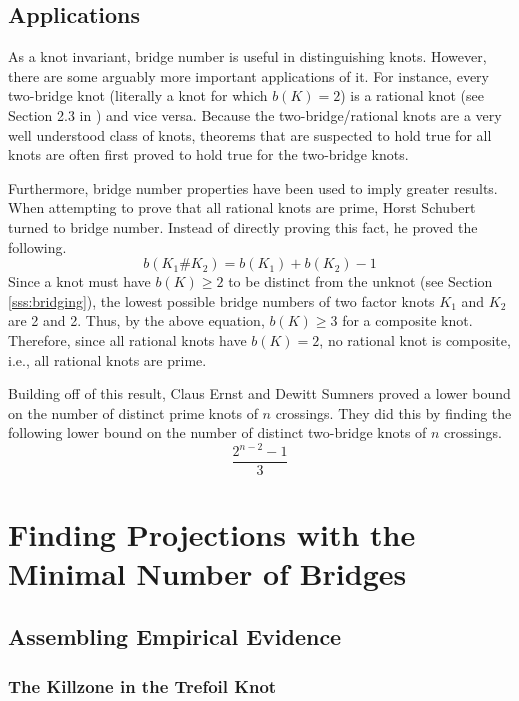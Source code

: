 \documentclass[titlepage]{article}
\begin{document}
\subsection{Applications}\label{sss:applications}
As a knot invariant, bridge number is useful in distinguishing knots. However, there are some arguably more important applications of it. For instance, every two-bridge knot (literally a knot for which $b(K)=2$) is a rational knot (see Section 2.3 in \cite{bib:knotnotes}) and vice versa. Because the two-bridge/rational knots are a very well understood class of knots, theorems that are suspected to hold true for all knots are often first proved to hold true for the two-bridge knots.\par
Furthermore, bridge number properties have been used to imply greater results. When attempting to prove that all rational knots are prime, Horst Schubert turned to bridge number. Instead of directly proving this fact, he proved the following.
\begin{equation*}
    b(K_1\#K_2) = b(K_1)+b(K_2)-1
\end{equation*}
Since a knot must have $b(K)\geq 2$ to be distinct from the unknot (see Section \ref{sss:bridging}), the lowest possible bridge numbers of two factor knots $K_1$ and $K_2$ are 2 and 2. Thus, by the above equation, $b(K)\geq 3$ for a composite knot. Therefore, since all rational knots have $b(K)=2$, no rational knot is composite, i.e., all rational knots are prime.\par
Building off of this result, Claus Ernst and Dewitt Sumners proved a lower bound on the number of distinct prime knots of $n$ crossings. They did this by finding the following lower bound on the number of distinct two-bridge knots of $n$ crossings.
\begin{equation*}
    \frac{2^{n-2}-1}{3}
\end{equation*}
\newpage



\section{Finding Projections with the Minimal Number of Bridges}
\subsection{Assembling Empirical Evidence}\label{sss:evidence}
\subsubsection{The Killzone in the Trefoil Knot}
\end{document}
